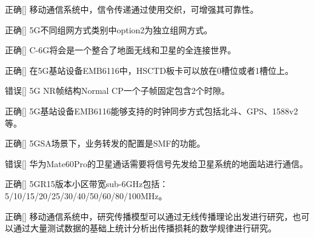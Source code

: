 \begin{choice}{\;正确\;}[]
    移动通信系统中，信令传递通过使用交织，可增强其可靠性。

\end{choice}

\begin{choice}{\;正确\;}[]
    5G不同组网方式类别中option2为独立组网方式。

\end{choice}


\begin{choice}{\;正确\;}[]
    C-6G将会是一个整合了地面无线和卫星的全连接世界。

\end{choice}


\begin{choice}{\;正确\;}[]
    在5G基站设备EMB6116中，HSCTD板卡可以放在0槽位或者1槽位上。

\end{choice}


\begin{choice}{\;错误\;}[]
    5G NR帧结构Normal CP一个子帧固定包含2个时隙。

\end{choice}


\begin{choice}{\;正确\;}[]
    5G基站设备EMB6116能够支持的时钟同步方式包括北斗、GPS、1588v2等。

\end{choice}


\begin{choice}{\;正确\;}[]
    5GSA场景下，业务转发的配置是SMF的功能。

\end{choice}


\begin{choice}{\;错误\;}[]
    华为Mate60Pro的卫星通话需要将信号先发给卫星系统的地面站进行通信。

\end{choice}


\begin{choice}{\;正确\;}[]
    5GR15版本小区带宽sub-6GHz包括：5/10/15/20/25/30/40/50/60/80/100MHz。

\end{choice}

\begin{choice}{\;正确\;}[]
    移动通信系统中，研究传播模型可以通过无线传播理论出发进行研究，也可以通过大量测试数据的基础上统计分析出传播损耗的数学规律进行研究。

\end{choice}

